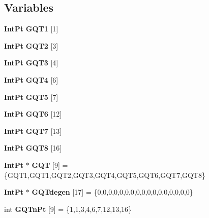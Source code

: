 \subsection*{Variables}
\begin{DoxyCompactItemize}
\item 
{\bf Int\-Pt} {\bfseries G\-Q\-T1} [1]
\item 
{\bf Int\-Pt} {\bfseries G\-Q\-T2} [3]
\item 
{\bf Int\-Pt} {\bfseries G\-Q\-T3} [4]
\item 
{\bf Int\-Pt} {\bfseries G\-Q\-T4} [6]
\item 
{\bf Int\-Pt} {\bfseries G\-Q\-T5} [7]
\item 
{\bf Int\-Pt} {\bfseries G\-Q\-T6} [12]
\item 
{\bf Int\-Pt} {\bfseries G\-Q\-T7} [13]
\item 
{\bf Int\-Pt} {\bfseries G\-Q\-T8} [16]
\item 
{\bf Int\-Pt} $\ast$ {\bfseries G\-Q\-T} [9] = \{G\-Q\-T1,G\-Q\-T1,G\-Q\-T2,G\-Q\-T3,G\-Q\-T4,G\-Q\-T5,G\-Q\-T6,G\-Q\-T7,G\-Q\-T8\}\label{GaussQuadratureTri_8cc_a5747498aa17571be37bab7170bfddfa4}

\item 
{\bf Int\-Pt} $\ast$ {\bfseries G\-Q\-Tdegen} [17] = \{0,0,0,0,0,0,0,0,0,0,0,0,0,0,0,0,0\}\label{GaussQuadratureTri_8cc_ac63783026eab60ed505ef292a0d1872a}

\item 
int {\bfseries G\-Q\-Tn\-Pt} [9] = \{1,1,3,4,6,7,12,13,16\}\label{GaussQuadratureTri_8cc_a087ccc8b4bc0190f05c5c0c9ca3d246a}


\end{DoxyCompactItemize}
